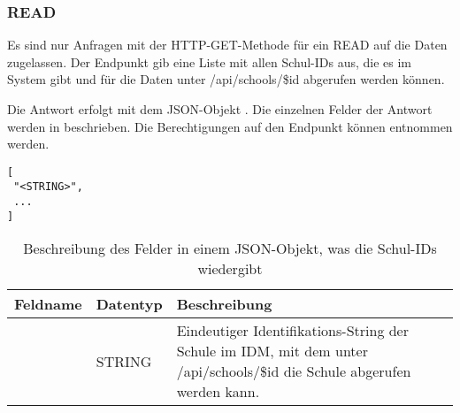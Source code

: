 \subsubsection{READ}
\label{sec:rest:api:school:read}
Es sind nur Anfragen mit der HTTP-GET-Methode für ein READ auf die Daten zugelassen.
Der Endpunkt gib eine Liste mit allen Schul-IDs aus, die es im System gibt und für die Daten unter /api/schools/\$id abgerufen werden können.

Die Antwort erfolgt mit dem JSON-Objekt . 
Die einzelnen Felder der Antwort werden in  beschrieben.
Die Berechtigungen auf den Endpunkt können  entnommen werden.

\begin{lstlisting}[caption={JSON-Antwort für einen GET-Aufruf des Pfads /api/schools},label={lst:code:rest:api:school:read:ret},frame=tlrb]
[
 "<STRING>",
 ...
]
\end{lstlisting}

\begin{longtable}{|p{}|p{}|p{}|}
		\caption{Beschreibung des Felder in einem JSON-Objekt, was die Schul-IDs wiedergibt}
\endfoot
		\caption{Beschreibung des Felder in einem JSON-Objekt, was die Schul-IDs wiedergibt}
		\label{tab:rest:api:school:read:ret}
\endlastfoot 
\hline
			\textbf{Feldname} & \textbf{Datentyp} & \textbf{Beschreibung} \\ \hline
\endhead
 & STRING & Eindeutiger Identifikations-String der Schule im IDM, mit dem unter /api/schools/\$id die Schule abgerufen werden kann.\\ \hline
\end{longtable}